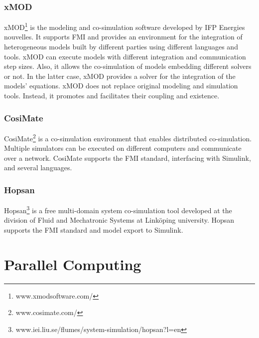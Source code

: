 \subsubsection{xMOD}
xMOD\footnote{www.xmodsoftware.com/} is the modeling and co-simulation software developed by IFP Energies nouvelles. It supports FMI and provides an environment for the integration of heterogeneous models built by different parties using different languages and tools. xMOD can execute models with different integration and communication step sizes. Also, it allows the co-simulation of models embedding different solvers or not. In the latter case, xMOD provides a solver for the integration of the models' equations. xMOD does not replace original modeling and simulation tools. Instead, it promotes and facilitates their coupling and existence.

\subsubsection{CosiMate}

CosiMate\footnote{www.cosimate.com/} is a co-simulation environment that enables distributed co-simulation. Multiple simulators can be executed on different computers and communicate over a network. CosiMate supports the FMI standard, interfacing with Simulink, and several languages.

\subsubsection{Hopsan}
Hopsan\footnote{www.iei.liu.se/flumes/system-simulation/hopsan?l=en} is a free multi-domain system co-simulation tool developed at the division of Fluid and Mechatronic Systems at Link\"oping university. Hopsan supports the FMI standard and model export to Simulink.

\section{Parallel Computing}

